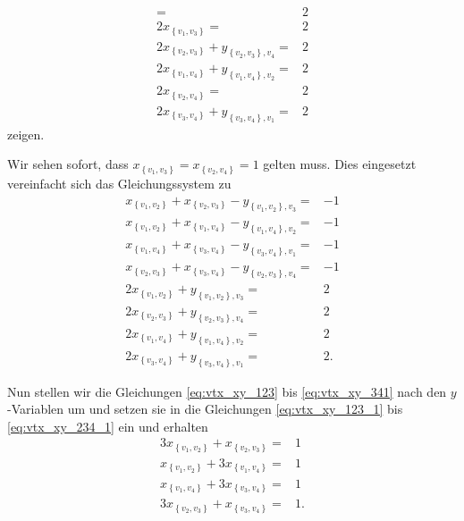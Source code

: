 \documentclass[10p,a4paper,BCOR = 12mm, DIV=15]{scrbook}
\begin{document}
{\begin{bew}
{\begin{align*}
 = & 2 \\
2 x_{\left\{v_1, v_3\right\}} 
 = & 2 \\
2 x_{\left\{v_2, v_3\right\}}
 + y_{\left\{v_2, v_3\right\}, v_4} = & 2 \\
2 x_{\left\{v_1, v_4\right\}} + y_{\left\{v_1, v_4\right\}, v_2}
 = & 2 \\
2 x_{\left\{v_2, v_4\right\}}
 = & 2 \\
2 x_{\left\{v_3, v_4\right\}} + y_{\left\{v_3, v_4\right\}, v_1}
 = & 2
\end{align*}
}
zeigen.

Wir sehen sofort, dass $x_{\left\{v_1, v_3\right\}} = x_{\left\{v_2, v_4\right\}}  = 1$ gelten muss. Dies eingesetzt vereinfacht sich das Gleichungssystem zu
{
\allowdisplaybreaks
\begin{align}
x_{\left\{v_1, v_2\right\}} + x_{\left\{v_2, v_3\right\}} - y_{\left\{v_1, v_2\right\}, v_3}
 = & -1 \label{eq:vtx_xy_123_1} \\
x_{\left\{v_1, v_2\right\}} + x_{\left\{v_1, v_4\right\}}
 - y_{\left\{v_1, v_4\right\}, v_2}
 = & -1 \\
x_{\left\{v_1, v_4\right\}} + x_{\left\{v_3, v_4\right\}}
 - y_{\left\{v_3, v_4\right\}, v_1} = & -1 \\
x_{\left\{v_2, v_3\right\}} + x_{\left\{v_3, v_4\right\}} - y_{\left\{v_2, v_3\right\}, v_4}
 = & -1 \label{eq:vtx_xy_234_1} \\
2 x_{\left\{v_1, v_2\right\}} + y_{\left\{v_1, v_2\right\}, v_3} 
 = & 2 \label{eq:vtx_xy_123} \\
2 x_{\left\{v_2, v_3\right\}}
 + y_{\left\{v_2, v_3\right\}, v_4} = & 2 \\
2 x_{\left\{v_1, v_4\right\}} + y_{\left\{v_1, v_4\right\}, v_2}
 = & 2 \\
2 x_{\left\{v_3, v_4\right\}} + y_{\left\{v_3, v_4\right\}, v_1}
 = & 2. \label{eq:vtx_xy_341}
\end{align}
}

Nun stellen wir die Gleichungen \eqref{eq:vtx_xy_123} bis \eqref{eq:vtx_xy_341} nach den $y$-Variablen um und setzen sie in die Gleichungen \eqref{eq:vtx_xy_123_1} bis \eqref{eq:vtx_xy_234_1} ein und erhalten
{
\allowdisplaybreaks
\begin{align*}
3 x_{\left\{v_1, v_2\right\}} + x_{\left\{v_2, v_3\right\}} = & 1 \\
x_{\left\{v_1, v_2\right\}} + 3 x_{\left\{v_1, v_4\right\}} = & 1 \\
x_{\left\{v_1, v_4\right\}} + 3 x_{\left\{v_3, v_4\right\}} = & 1 \\
3 x_{\left\{v_2, v_3\right\}} + x_{\left\{v_3, v_4\right\}} = & 1.
\end{align*}
}


\end{bew}}
\end{document}
